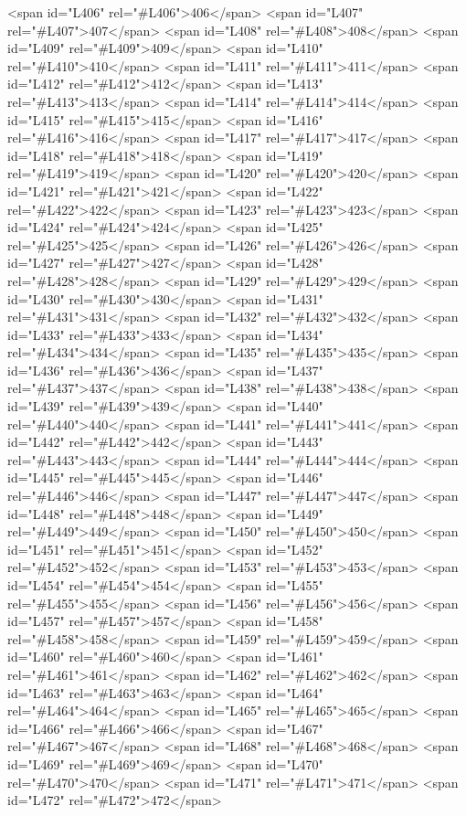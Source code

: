 <span id="L406" rel="#L406">406</span>
<span id="L407" rel="#L407">407</span>
<span id="L408" rel="#L408">408</span>
<span id="L409" rel="#L409">409</span>
<span id="L410" rel="#L410">410</span>
<span id="L411" rel="#L411">411</span>
<span id="L412" rel="#L412">412</span>
<span id="L413" rel="#L413">413</span>
<span id="L414" rel="#L414">414</span>
<span id="L415" rel="#L415">415</span>
<span id="L416" rel="#L416">416</span>
<span id="L417" rel="#L417">417</span>
<span id="L418" rel="#L418">418</span>
<span id="L419" rel="#L419">419</span>
<span id="L420" rel="#L420">420</span>
<span id="L421" rel="#L421">421</span>
<span id="L422" rel="#L422">422</span>
<span id="L423" rel="#L423">423</span>
<span id="L424" rel="#L424">424</span>
<span id="L425" rel="#L425">425</span>
<span id="L426" rel="#L426">426</span>
<span id="L427" rel="#L427">427</span>
<span id="L428" rel="#L428">428</span>
<span id="L429" rel="#L429">429</span>
<span id="L430" rel="#L430">430</span>
<span id="L431" rel="#L431">431</span>
<span id="L432" rel="#L432">432</span>
<span id="L433" rel="#L433">433</span>
<span id="L434" rel="#L434">434</span>
<span id="L435" rel="#L435">435</span>
<span id="L436" rel="#L436">436</span>
<span id="L437" rel="#L437">437</span>
<span id="L438" rel="#L438">438</span>
<span id="L439" rel="#L439">439</span>
<span id="L440" rel="#L440">440</span>
<span id="L441" rel="#L441">441</span>
<span id="L442" rel="#L442">442</span>
<span id="L443" rel="#L443">443</span>
<span id="L444" rel="#L444">444</span>
<span id="L445" rel="#L445">445</span>
<span id="L446" rel="#L446">446</span>
<span id="L447" rel="#L447">447</span>
<span id="L448" rel="#L448">448</span>
<span id="L449" rel="#L449">449</span>
<span id="L450" rel="#L450">450</span>
<span id="L451" rel="#L451">451</span>
<span id="L452" rel="#L452">452</span>
<span id="L453" rel="#L453">453</span>
<span id="L454" rel="#L454">454</span>
<span id="L455" rel="#L455">455</span>
<span id="L456" rel="#L456">456</span>
<span id="L457" rel="#L457">457</span>
<span id="L458" rel="#L458">458</span>
<span id="L459" rel="#L459">459</span>
<span id="L460" rel="#L460">460</span>
<span id="L461" rel="#L461">461</span>
<span id="L462" rel="#L462">462</span>
<span id="L463" rel="#L463">463</span>
<span id="L464" rel="#L464">464</span>
<span id="L465" rel="#L465">465</span>
<span id="L466" rel="#L466">466</span>
<span id="L467" rel="#L467">467</span>
<span id="L468" rel="#L468">468</span>
<span id="L469" rel="#L469">469</span>
<span id="L470" rel="#L470">470</span>
<span id="L471" rel="#L471">471</span>
<span id="L472" rel="#L472">472</span>
